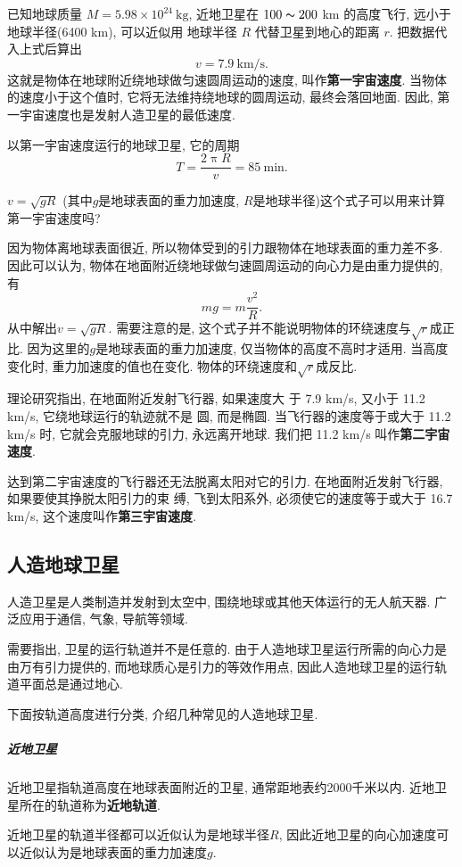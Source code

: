 \documentclass[11pt,a4paper]{ctexbook}
\newcommand{\unit}[1]{\ \mathrm{#1}}
\begin{document}
已知地球质量 $M = 5.98\times 10^{24} \unit{kg}$, 近地卫星在 $100 \thicksim 200$ km
的高度飞行, 远小于地球半径(6400 km), 可以近似用
地球半径 $R$ 代替卫星到地心的距离 $r$. 把数据代入上式后算出
$$v = 7.9\ \mathrm{km/s}.$$
这就是物体在地球附近绕地球做匀速圆周运动的速度, 叫作\textbf{第一宇宙速度}.
当物体的速度小于这个值时, 它将无法维持绕地球的圆周运动, 最终会落回地面.
因此, 第一宇宙速度也是发射人造卫星的最低速度.

以第一宇宙速度运行的地球卫星, 它的周期$$T = \frac{2\uppi R}{v} = 85\unit{min}.$$

{\kaishu $v=\sqrt{gR}$ (其中$g$是地球表面的重力加速度, $R$是地球半径)这个式子可以用来计算第一宇宙速度吗?}

因为物体离地球表面很近, 所以物体受到的引力跟物体在地球表面的重力差不多.
因此可以认为, 物体在地面附近绕地球做匀速圆周运动的向心力是由重力提供的, 有
$$mg = m\frac{v^2}{R}.$$
从中解出$v = \sqrt{gR}.$
需要注意的是, 这个式子并不能说明物体的环绕速度与$\sqrt{r}$成正比.
因为这里的$g$是地球表面的重力加速度, 仅当物体的高度不高时才适用.
当高度变化时, 重力加速度的值也在变化.
物体的环绕速度和$\sqrt{r}$成反比.

理论研究指出, 在地面附近发射飞行器, 如果速度大
于 7.9 km/s, 又小于 11.2 km/s, 它绕地球运行的轨迹就不是
圆, 而是椭圆. 当飞行器的速度等于或大于 11.2 km/s 时,
它就会克服地球的引力, 永远离开地球. 我们把 11.2 km/s
叫作\textbf{第二宇宙速度}.

达到第二宇宙速度的飞行器还无法脱离太阳对它的引力. 在地面附近发射飞行器, 如果要使其挣脱太阳引力的束
缚, 飞到太阳系外, 必须使它的速度等于或大于 16.7 km/s, 这个速度叫作\textbf{第三宇宙速度}.

\subsection{人造地球卫星}
人造卫星是人类制造并发射到太空中, 围绕地球或其他天体运行的无人航天器.
广泛应用于通信, 气象, 导航等领域.

需要指出, 卫星的运行轨道并不是任意的. 由于人造地球卫星运行所需的向心力是由万有引力提供的,
而地球质心是引力的等效作用点,
因此人造地球卫星的运行轨道平面总是通过地心.

下面按轨道高度进行分类, 介绍几种常见的人造地球卫星.

\subparagraph{近地卫星} 近地卫星指轨道高度在地球表面附近的卫星, 通常距地表约2000千米以内. 近地卫星所在的轨道称为\textbf{近地轨道}.

近地卫星的轨道半径都可以近似认为是地球半径$R$, 因此近地卫星的向心加速度可以近似认为是地球表面的重力加速度$g$.
\end{document}
